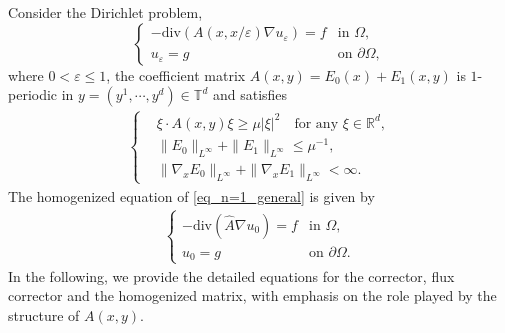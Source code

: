 \documentclass[reqno,12pt]{amsart} %
\theoremstyle{definition}
\theoremstyle{remark}
\numberwithin{equation}{section}
\newcommand{\T}{\mathbb{T}}
\newcommand{\e}{\varepsilon}
\begin{document}
Consider the Dirichlet problem,
\begin{equation}
  \label{eq_n=1_general}
  \begin{cases}
    -\mathrm{div}(A(x, x/\e)\nabla u_\varepsilon)=f&\text{in }\Omega, \\
    u_\varepsilon=g &\text{on }\partial\Omega,
  \end{cases}
\end{equation}
where $0<\varepsilon\leq 1$, the coefficient matrix $A(x, y)=E_0(x)+E_1(x, y)$ 
is $1$-periodic in $y = (y^1,\cdots, y^d) \in \T^d$ 
and satisfies
\begin{gather}\label{conver_cond_case-n=1}
\left\{
  \begin{split}
    & \xi \cdot A(x, y)\xi \geq \mu|\xi|^2\quad \text{for any }\xi \in\mathbb{R}^{d},\\
  & \|E_0\|_{L^\infty}+\|E_1\|_{L^\infty}\leq \mu^{-1},\\
  & \|\nabla_x E_0\|_{L^\infty}+\|\nabla_x E_1\|_{L^\infty}<\infty.
  \end{split}
  \right.
\end{gather}
The homogenized equation of \eqref{eq_n=1_general} is given by
\begin{align}\label{eq_n=1.homo}
  \begin{cases}
    -\mathrm{div}(\widehat{A}\nabla u_0)=f&\text{in }\Omega, \\
    u_0=g &\text{on }\partial\Omega.
  \end{cases}
\end{align}
In the following, we provide the detailed equations for the corrector, flux corrector and the homogenized matrix, with emphasis on the role played by the structure of $A(x,y)$.
\end{document}
